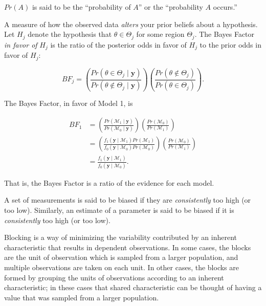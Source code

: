 \documentclass[
  letterpaper,
  DIV=11,
  numbers=noendperiod]{scrreprt}
\providecommand{\tightlist}{%
  \setlength{\itemsep}{0pt}\setlength{\parskip}{0pt}}\usepackage{longtable,booktabs,array}
\theoremstyle{definition}
\theoremstyle{definition}
\theoremstyle{plain}
\theoremstyle{remark}
\begin{document}
\(Pr(A)\) is said to be the ``probability of \(A\)'' or the
``probability \(A\) occurs.''

\begin{description}
\tightlist
\item[Bayes Factor (Definition~\ref{def-bayes-factor})]
A measure of how the observed data \emph{alters} your prior beliefs
about a hypothesis. Let \(H_j\) denote the hypothesis that
\(\theta \in \Theta_j\) for some region \(\Theta_j\). The Bayes Factor
\emph{in favor of} \(H_j\) is the ratio of the posterior odds in favor
of \(H_j\) to the prior odds in favor of \(H_j\):
\end{description}

\[BF_j = \left(\frac{Pr\left(\theta \in \Theta_j \mid \mathbf{y}\right)}{Pr\left(\theta \notin \Theta_j \mid \mathbf{y}\right)}\right)\left(\frac{Pr\left(\theta \notin \Theta_j\right)}{Pr\left(\theta \in \Theta_j\right)}\right).\]

\begin{description}
\tightlist
\item[Bayes Factor for Model Comparison
(Definition~\ref{def-bayes-factor-models})]
The Bayes Factor, in favor of Model 1, is
\end{description}

\[
\begin{aligned}
  BF_{1} &= \left(\frac{Pr(\mathcal{M}_1 \mid \mathbf{y})}{Pr(\mathcal{M}_0 \mid \mathbf{y})}\right)\left(\frac{Pr(\mathcal{M}_0)}{Pr(\mathcal{M}_1)}\right) \\
    &= \left(\frac{f_1(\mathbf{y} \mid \mathcal{M}_1) Pr(\mathcal{M}_1)}{f_0(\mathbf{y} \mid \mathcal{M}_0) Pr(\mathcal{M}_0)}\right)\left(\frac{Pr(\mathcal{M}_0)}{Pr(\mathcal{M}_1)}\right) \\
    &= \frac{f_1(\mathbf{y} \mid \mathcal{M}_1)}{f_0(\mathbf{y} \mid \mathcal{M}_0)}.
\end{aligned}
\]

That is, the Bayes Factor is a ratio of the evidence for each model.

\begin{description}
\tightlist
\item[Bias (Definition~\ref{def-bias})]
A set of measurements is said to be biased if they are
\emph{consistently} too high (or too low). Similarly, an estimate of a
parameter is said to be biased if it is \emph{consistently} too high (or
too low).
\item[Blocking (Definition~\ref{def-blocking})]
Blocking is a way of minimizing the variability contributed by an
inherent characteristic that results in dependent observations. In some
cases, the blocks are the unit of observation which is sampled from a
larger population, and multiple observations are taken on each unit. In
other cases, the blocks are formed by grouping the units of observations
according to an inherent characteristic; in these cases that shared
characteristic can be thought of having a value that was sampled from a
larger population.
\end{description}
\end{document}

